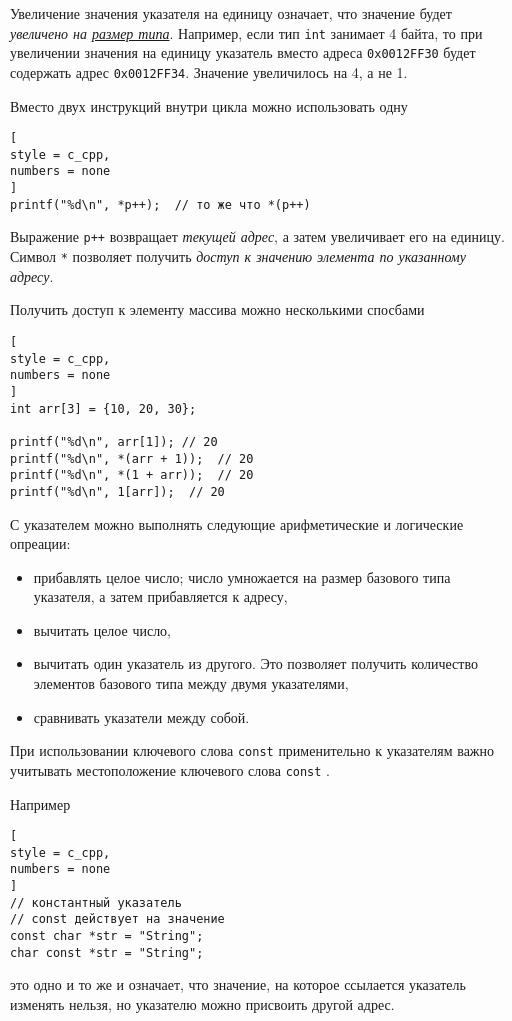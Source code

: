 \documentclass[%
	11pt,
	a4paper,
	utf8,
		]{article}
\begin{document}
Увеличение значения указателя на единицу означает, что значение будет \emph{увеличено на \underline{размер типа}}. Например, если тип \verb*|int| занимает 4 байта, то при увеличении значения на единицу указатель вместо адреса \verb|0x0012FF30| будет содержать адрес \verb*|0x0012FF34|. Значение увеличилось на 4, а не 1.

Вместо двух инструкций внутри цикла можно использовать одну
\begin{lstlisting}[
style = c_cpp,
numbers = none
]
printf("%d\n", *p++);  // то же что *(p++)
\end{lstlisting}

Выражение \verb|p++| возвращает \emph{текущей адрес}, а затем увеличивает его на единицу. Символ \verb*|*| позволяет получить \emph{доступ к значению элемента по указанному адресу}.

Получить доступ к элементу массива можно несколькими спосбами
\begin{lstlisting}[
style = c_cpp,
numbers = none	
]
int arr[3] = {10, 20, 30};

printf("%d\n", arr[1]); // 20
printf("%d\n", *(arr + 1));  // 20
printf("%d\n", *(1 + arr));  // 20
printf("%d\n", 1[arr]);  // 20
\end{lstlisting}

С указателем можно выполнять следующие арифметические и логические опреации:
\begin{itemize}
	\item прибавлять целое число; число умножается на размер базового типа указателя, а затем прибавляется к адресу,
	
	\item вычитать целое число,
	
	\item вычитать один указатель из другого. Это позволяет получить количество элементов базового типа между двумя указателями,
	
	\item сравнивать указатели между собой.
\end{itemize}

При использовании ключевого слова \verb*|const| применительно к указателям важно учитывать местоположение ключевого слова \verb|const| \cite[]{prokhorenok-prog-c:2020}. 

Например
\begin{lstlisting}[
style = c_cpp,
numbers = none
]
// константный указатель
// const действует на значение
const char *str = "String";
char const *str = "String";
\end{lstlisting}
это одно и то же и означает, что значение, на которое ссылается указатель изменять нельзя, но указателю можно присвоить другой адрес.
\end{document}

